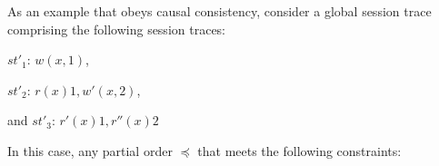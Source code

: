 \documentclass[journal,compsoc]{IEEEtran}
\begin{document}

As an example that obeys causal consistency, consider a global session trace comprising the following session traces:

$\mathit{st}'_1$: $w(x,1)$,

 $\mathit{st}'_2$: $r(x){1}, w'(x,2)$,

 and  $\mathit{st}'_3$: $r'(x){1}, r''(x){2}$

In this case, any partial order  $\preccurlyeq$  that meets the following constraints:
\end{document}
